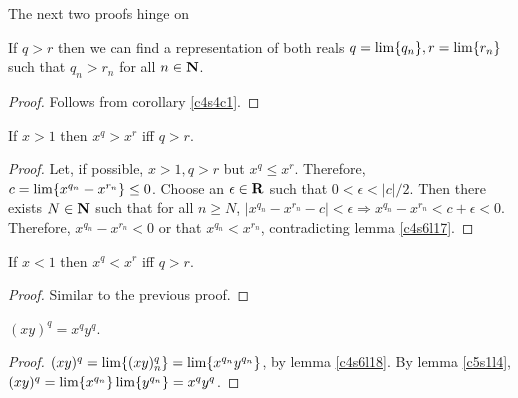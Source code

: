 The next two proofs hinge on
\begin{lem}\label{c5s7l7}
If $q > r$ then we can find a representation of both reals $q = 
\lim\{q_n\}, r = \lim\{r_n\}$ such that $q_n > r_n$ for all $n \in 
\mathbf{N}$.
\end{lem}
\begin{proof}
Follows from corollary \ref{c4s4c1}.
\end{proof}

\begin{lem}\label{c5s7l8}
If $x > 1$ then $x^q > x^r$ iff $q > r$.
\end{lem}
\begin{proof}
Let, if possible, $x > 1, q > r$ but $x^q \le x^r$. Therefore, $c = 
\lim\{x^{q_n} - x^{r_n}\} \le 0$. Choose an $\epsilon \in \mathbf{R}$ such
that $0 < \epsilon < |c|/2$. Then there exists $N \in \mathbf{N}$ such that for
all $n \ge N$, $|x^{q_n} - x^{r_n} - c| < \epsilon \Rightarrow x^{q_n}
- x^{r_n} < c + \epsilon < 0$. Therefore, $x^{q_n} - x^{r_n} < 0$ or that
$x^{q_n} < x^{r_n}$, contradicting lemma \ref{c4s6l17}.
\end{proof}

\begin{lem}\label{c5s7l9}
If $x < 1$ then $x^q < x^r$ iff $q > r$.
\end{lem}
\begin{proof}
Similar to the previous proof.
\end{proof}

\begin{lem}\label{c5s7l10}
$(xy)^q = x^q y^q$.
\end{lem}
\begin{proof}
$(xy)^q = \lim\{(xy)^q_n\} = \lim\{x^{q_n}y^{q_n}\}$, by lemma 
\ref{c4s6l18}. By lemma \ref{c5s1l4}, $(xy)^q = \lim\{x^{q_n}\}
\lim\{y^{q_n}\} = x^qy^q$.
\end{proof}

